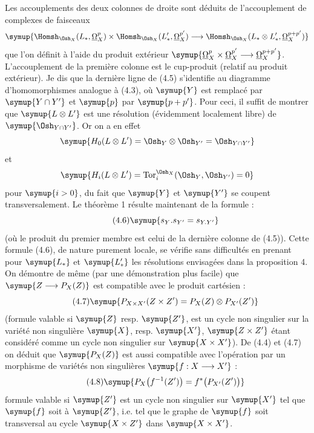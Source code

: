 Les accouplements des deux colonnes de droite sont déduits de l'accouplement de
complexes de faisceaux
\[
\symup{\Homsh_{\Osh_X}(L_{*},\underline{\Omega}_X^{p})
\times\Homsh_{\Osh_X}(L'_{*},\underline{\Omega}_X^{p'})
\longrightarrow
\Homsh_{\Osh_X}(L_{*}\otimes L'_{*},\underline{\Omega}_X^{p+p'})}
\]
que l'on définit à l'aide du produit extérieur
$\symup{\underline{\Omega}_X^{p}\times\underline{\Omega}_X^{p'}\longrightarrow\underline{\Omega}_X^{p+p'}}$.
L'accouplement de la première colonne est le cup-produit (relatif au produit
extérieur). Je dis que la dernière ligne de (4.5) s'identifie au diagramme
d'homomorphismes analogue à (4.3), où $\symup{Y}$ est remplacé par $\symup{Y\cap Y'}$ et $\symup{p}$ par
$\symup{p+p'}$. Pour ceci, il suffit de montrer que $\symup{L\otimes L'}$ est une résolution
(évidemment localement libre) de $\symup{\Osh_{Y\cap Y'}}$. Or on a en effet
\[
  \symup{H_0(L\otimes L')=\Osh_Y\otimes\Osh_{Y'}=\Osh_{Y\cap Y'}}
\]
et
\[
  \symup{H_i(L\otimes L')=\operatorname{Tor}_{i}^{\Osh_X}(\Osh_Y,\Osh_{Y'})=0}
\]
pour $\symup{i>0}$, du fait que $\symup{Y}$ et $\symup{Y'}$ se coupent transversalement. Le théorème 1 résulte
maintenant de la formule :
\begin{equation}\tag{4.6}
  \symup{s_Y.s_{Y'}=s_{Y.Y'}}
\end{equation}
(où le produit du premier membre est celui de la dernière colonne de (4.5)).
Cette formule (4.6), de nature purement locale, se vérifie sans difficultés en
prenant pour $\symup{L_{*}}$ et $\symup{L'_{*}}$ les résolutions envisagées dans la proposition
4. On démontre de même (par une démonstration plus facile) que
$\symup{Z\longrightarrow P_X(Z)}$ est compatible avec le produit cartésien :
\begin{equation}\tag{4.7}
  \symup{P_{X\times X'}(Z\times Z')=P_X(Z)\otimes P_{X'}(Z')}
\end{equation}
(formule valable si $\symup{Z}$ resp. $\symup{Z'}$, est un cycle non singulier sur la variété
non singulière $\symup{X}$, resp. $\symup{X'}$, $\symup{Z\times Z'}$ étant considéré comme un cycle non
singulier sur $\symup{X\times X'}$). De (4.4) et (4.7) on déduit que $\symup{P_X(Z)}$ est aussi
compatible avec l'opération  par un morphisme de variétés non
singulières $\symup{f:X\longrightarrow X'}$ :
\begin{equation}\tag{4.8}
  \symup{P_X\bigl(f^{-1}(Z')\bigr)=f^{*}\bigl(P_{X'}(Z')\bigr)}
\end{equation}
formule valable si $\symup{Z'}$ est un cycle non singulier sur $\symup{X'}$ tel que $\symup{f}$ soit
 à $\symup{Z'}$, i.e. tel que le graphe de $\symup{f}$ soit transversal au cycle
$\symup{X\times Z'}$ dans $\symup{X\times X'}$.

